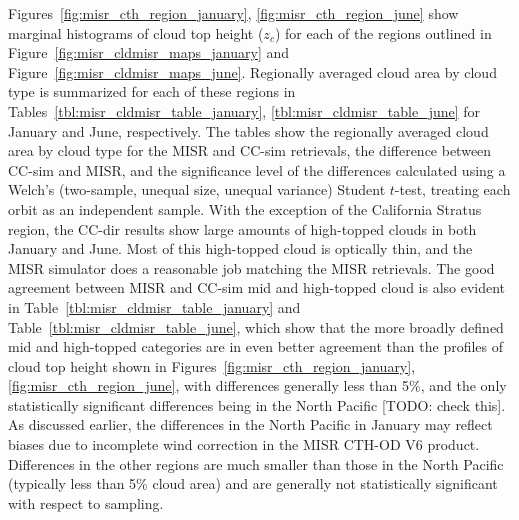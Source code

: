 Figures~\ref{fig:misr_cth_region_january}, \ref{fig:misr_cth_region_june}
show marginal histograms of cloud top height (\(z_c\)) for each of the
regions outlined in Figure~\ref{fig:misr_cldmisr_maps_january} and
Figure~\ref{fig:misr_cldmisr_maps_june}. Regionally averaged cloud area
by cloud type is summarized for each of these regions in
Tables~\ref{tbl:misr_cldmisr_table_january}, \ref{tbl:misr_cldmisr_table_june}
for January and June, respectively. The tables show the regionally
averaged cloud area by cloud type for the MISR and CC-sim retrievals,
the difference between CC-sim and MISR, and the significance level of
the differences calculated using a Welch's (two-sample, unequal size,
unequal variance) Student \(t\)-test, treating each orbit as an
independent sample. With the exception of the California Stratus region,
the CC-dir results show large amounts of high-topped clouds in both
January and June. Most of this high-topped cloud is optically thin, and
the MISR simulator does a reasonable job matching the MISR retrievals.
The good agreement between MISR and CC-sim mid and high-topped cloud is
also evident in Table~\ref{tbl:misr_cldmisr_table_january} and
Table~\ref{tbl:misr_cldmisr_table_june}, which show that the more
broadly defined mid and high-topped categories are in even better
agreement than the profiles of cloud top height shown in
Figures~\ref{fig:misr_cth_region_january}, \ref{fig:misr_cth_region_june},
with differences generally less than 5\%, and the only statistically
significant differences being in the North Pacific {[}TODO: check
this{]}. As discussed earlier, the differences in the North Pacific in
January may reflect biases due to incomplete wind correction in the MISR
CTH-OD V6 product. Differences in the other regions are much smaller
than those in the North Pacific (typically less than 5\% cloud area) and
are generally not statistically significant with respect to sampling.


